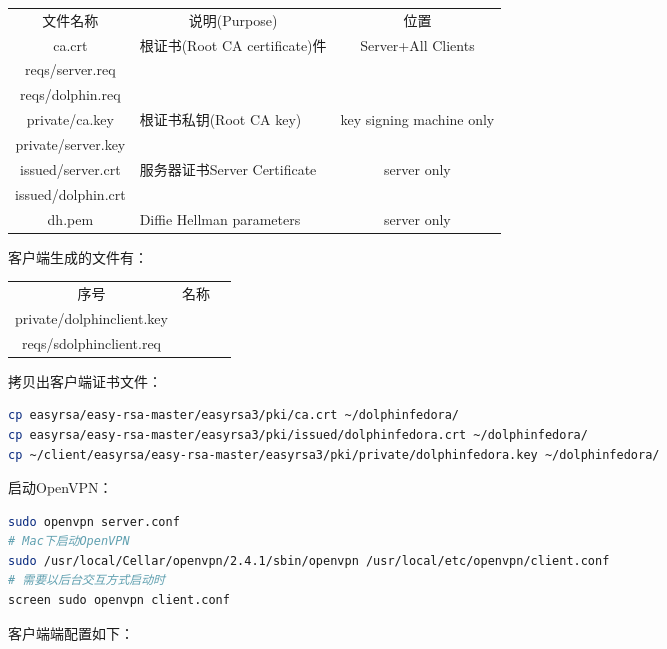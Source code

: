 \documentclass[letter]{book}
\begin{document}
\begin{tabular}{|c|p{5cm}|c|}
	\hline
	\multirow{1}{*}{文件名称}
	& \multicolumn{1}{c|}{说明(Purpose)} 
	& \multicolumn{1}{c|}{位置} \\			
	\cline{1-3}
	ca.crt  & 根证书(Root CA certificate)件 & Server+All Clients	\\
	\hline
	reqs/server.req  & &\\
	\hline
	reqs/dolphin.req  & &\\
	\hline
	private/ca.key & 根证书私钥(Root CA key) & key signing machine only\\
	\hline
	private/server.key && \\
	\hline
	issued/server.crt & 服务器证书Server Certificate & server only\\
	\hline
	issued/dolphin.crt && \\
	\hline
	dh.pem & Diffie Hellman parameters & server only \\
	\hline
\end{tabular}

客户端生成的文件有：

\begin{tabular}{|c|p{8cm}|c|}
	\hline
	\multirow{1}{*}{序号}
	& \multicolumn{1}{c|}{名称}  \\			
	\cline{1-2}
	private/dolphinclient.key  & \\
	\hline
	reqs/sdolphinclient.req & \\
	\hline
\end{tabular}

拷贝出客户端证书文件：

\begin{lstlisting}[language=Bash]
cp easyrsa/easy-rsa-master/easyrsa3/pki/ca.crt ~/dolphinfedora/
cp easyrsa/easy-rsa-master/easyrsa3/pki/issued/dolphinfedora.crt ~/dolphinfedora/
cp ~/client/easyrsa/easy-rsa-master/easyrsa3/pki/private/dolphinfedora.key ~/dolphinfedora/
\end{lstlisting}


启动OpenVPN：

\begin{lstlisting}[language=Bash]
sudo openvpn server.conf
# Mac下启动OpenVPN
sudo /usr/local/Cellar/openvpn/2.4.1/sbin/openvpn /usr/local/etc/openvpn/client.conf
# 需要以后台交互方式启动时
screen sudo openvpn client.conf
\end{lstlisting}

客户端端配置如下：
\end{document}
